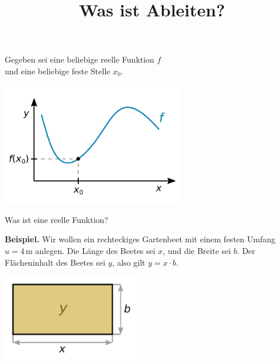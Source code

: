 \documentclass{beamer}
\title{Was ist Ableiten?}
\date{}
\newcommand{\unit}[1]{\mathrm{#1}}
\newcommand{\strong}[1]{\textsf{\textbf{#1}}}
\begin{document}
\begin{frame}
\maketitle
\end{frame}

\begin{frame}[t]
\vspace{2em}
Gegeben sei eine beliebige reelle Funktion $f$\\
und eine beliebige feste Stelle $x_0$.\pause

\vspace{-1em}
\begin{center}
\includegraphics[width=80mm]{img/Funktion.pdf}
\end{center}
\end{frame}

\begin{frame}[t]
\vspace{1em}
Was ist eine reelle Funktion?\pause

\vspace{0.6em}
\strong{Beispiel.} Wir wollen ein
rechteckiges Gartenbeet mit einem festen Umfang $u=4\,\unit{m}$
anlegen. Die Länge des Beetes sei $x$, und die Breite sei $b$.
Der Flächeninhalt des Beetes sei $y$, also gilt $y=x\cdot b$.\pause

\vspace{-1em}
\begin{center}
\includegraphics[width=60mm]{img/Beet.pdf}
\end{center}
\end{frame}
\end{document}
